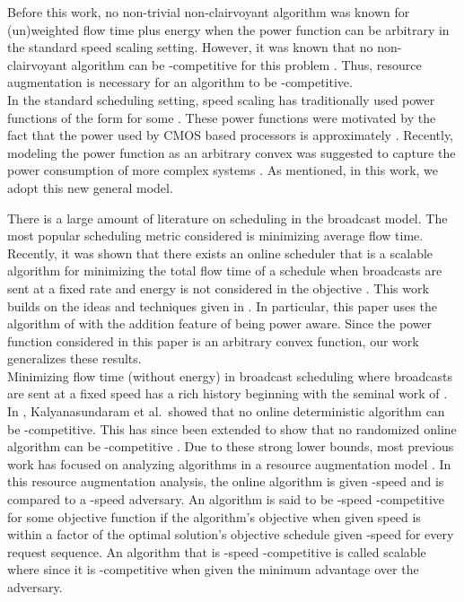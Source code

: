 \documentclass[11pt]{article}
\newcommand{\etal}{et al.\ }
\begin{document}
Before this work, no non-trivial non-clairvoyant algorithm was known for (un)weighted flow time plus energy when the power function can be arbitrary in the standard speed scaling setting. However, it was known that no non-clairvoyant algorithm can be -competitive for this problem \cite{ChanELLMP09}.  Thus, resource augmentation is necessary for an algorithm to be -competitive. \\
 


 In the standard scheduling setting, speed scaling has traditionally used power functions of the form  for some .  These power functions were motivated by the fact that  the power used by CMOS based processors is approximately . Recently, modeling the power function as an arbitrary convex was suggested to capture the power consumption of more complex systems \cite{BansalKN09}. As mentioned, in this work, we adopt this new general model.

 There is a large amount of literature on scheduling in the broadcast model.  The most popular scheduling metric considered is minimizing average flow time. Recently, it was shown that there exists an online scheduler that is a scalable algorithm for minimizing the total flow time of a schedule when broadcasts are sent at a fixed rate and energy is not considered in the objective \cite{ImM10, BansalKN09}. This work builds on the ideas and techniques given in \cite{BansalKN09}.  In particular, this paper uses the algorithm of \cite{BansalKN09} with the addition feature of being power aware.  Since the power function considered in this paper is an arbitrary convex function, our work generalizes these results.  \\



  Minimizing flow time (without energy) in broadcast scheduling where broadcasts are sent at a fixed speed has a rich history beginning with the seminal work of \cite{KalyanasundaramPV00,BartalM00}.  In \cite{KalyanasundaramPV00},  Kalyanasundaram \etal showed that no online deterministic algorithm can be -competitive.  This has since been extended to show that no randomized online algorithm can be -competitive \cite{BansalCKN05}.  Due to these strong lower bounds, most previous work has focused on analyzing algorithms in a resource augmentation model \cite{KalyanasundaramP95}.  In this resource augmentation analysis, the online algorithm is given -speed and is compared to a -speed adversary.  An algorithm is said to be -speed -competitive for some objective function if the algorithm's objective when given  speed is within a  factor of the optimal solution's objective schedule given -speed for every request sequence.    An algorithm that is -speed -competitive is called scalable where  since it is -competitive when given the minimum advantage over the adversary.  
\end{document}
